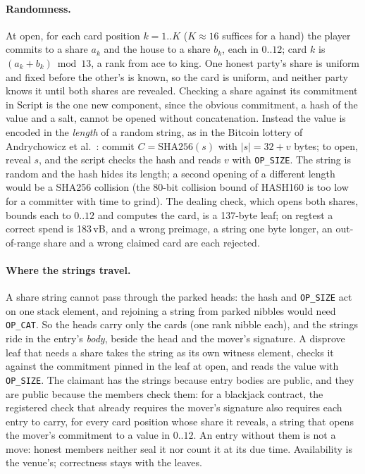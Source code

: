 \documentclass[11pt]{article}
\newcommand{\op}[1]{\texttt{OP\_#1}}
\begin{document}
\paragraph{Randomness.} At open, for each card position $k = 1..K$
($K \approx 16$ suffices for a hand) the player commits to a share
$a_k$ and the house to a share $b_k$, each in $0..12$; card $k$ is
$(a_k + b_k) \bmod 13$, a rank from ace to king. One honest party's share
is uniform and fixed before the other's is known, so the card is
uniform, and neither party knows it until both shares are revealed.
Checking a share against its commitment in Script is the one new
component, since the obvious commitment, a hash of the value and a
salt, cannot be opened without concatenation. Instead the value is
encoded in the \emph{length} of a random string, as in the Bitcoin
lottery of Andrychowicz et al.~\cite{smcbitcoin}: commit
$C = \mathrm{SHA256}(s)$ with $|s| = 32 + v$ bytes; to open, reveal $s$,
and the script checks the hash and reads $v$ with \op{SIZE}. The string
is random and the hash hides its length; a second opening of a
different length would be a SHA256 collision (the 80-bit collision
bound of HASH160 is too low for a committer with time to grind). The
dealing check, which opens both shares, bounds each to $0..12$ and
computes the card, is a 137-byte leaf; on regtest a correct spend is
183\,vB, and a wrong preimage, a string one byte longer, an
out-of-range share and a wrong claimed card are each rejected.

\paragraph{Where the strings travel.} A share string cannot pass
through the parked heads: the hash and \op{SIZE} act on one stack
element, and rejoining a string from parked nibbles would need
\op{CAT}. So the heads carry only the cards (one rank nibble each), and
the strings ride in the entry's \emph{body}, beside the head and the
mover's signature. A disprove leaf that needs a share takes the string
as its own witness element, checks it against the commitment pinned in
the leaf at open, and reads the value with \op{SIZE}. The claimant has
the strings because entry bodies are public, and they are public
because the members check them: for a blackjack contract, the
registered check that already requires the mover's signature also
requires each entry to carry, for every card position whose share it
reveals, a string that opens the mover's commitment to a value in
$0..12$. An entry without them is not a move: honest members neither
seal it nor count it at its due time. Availability is the venue's;
correctness stays with the leaves.
\end{document}
